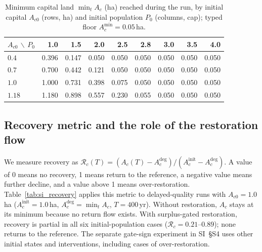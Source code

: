 \documentclass[11pt,a4paper]{article}
\newcommand{\Acmin}{A_c^{\min}}
\begin{document}
\begin{table}[htbp]
\centering\small
\caption{Minimum capital land $\min_tA_c$ (ha) reached during the run, by initial capital $A_{c0}$ (rows, ha) and initial population $P_0$ (columns, cap); typed floor $\Acmin=0.05$\,ha.}
\label{tab:si_drawdown}
\begin{tabular}{lrrrrrrrr}
\toprule
$A_{c0}$ $\backslash$ $P_0$ & 1.0 & 1.5 & 2.0 & 2.5 & 2.8 & 3.0 & 3.5 & 4.0 \\
\midrule
$0.4$ & 0.396 & 0.147 & 0.050 & 0.050 & 0.050 & 0.050 & 0.050 & 0.050 \\
$0.7$ & 0.700 & 0.442 & 0.121 & 0.050 & 0.050 & 0.050 & 0.050 & 0.050 \\
$1.0$ & 1.000 & 0.731 & 0.398 & 0.075 & 0.050 & 0.050 & 0.050 & 0.050 \\
$1.18$ & 1.180 & 0.898 & 0.557 & 0.230 & 0.055 & 0.050 & 0.050 & 0.050 \\
\bottomrule
\end{tabular}
\end{table}

\subsection{Recovery metric and the role of the restoration flow}\label{si:recovery}

We measure recovery as $\mathcal R_c(T)=(A_c(T)-A_c^{\mathrm{deg}})/(A_c^{\mathrm{init}}-A_c^{\mathrm{deg}})$. A value of 0 means no recovery, 1 means return to the reference, a negative value means further decline, and a value above 1 means over-restoration. Table~\ref{tab:si_recovery} applies this metric to delayed-quality runs with $A_{c0}=1.0$\,ha ($A_c^{\mathrm{init}}=1.0$\,ha, $A_c^{\mathrm{deg}}=\min_tA_c$, $T=400$\,yr). Without restoration, $A_c$ stays at its minimum because no return flow exists. With surplus-gated restoration, recovery is partial in all six initial-population cases ($\mathcal R_c=0.21$--$0.89$); none returns to the reference. The separate gate-sign experiment in SI~\S S4 uses other initial states and interventions, including cases of over-restoration.
\end{document}
